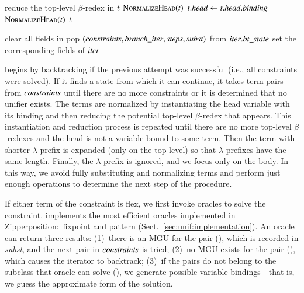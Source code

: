 \begin{algorithmic}[]
  \newpage
  
      \State reduce the top-level $\beta$-redex in $t$
      \State \Return $\textsc{NormalizeHead}(t)$
      \State $\mathit{t.head} \gets \mathit{t.head.binding}$
      \State \Return $\textsc{NormalizeHead}(t)$
    \Else{}
      \State \Return $t$
    \EndIf
  \EndFunction
  
  \vspace{\jot}
      \State clear all fields in 
      \State \Return {}
    \Else
    \State pop $(\mathit{constraints}, \mathit{branch\_iter}, \mathit{steps}, \mathit{subst})$ from $\mathit{iter.bt\_state}$
    \State set the corresponding fields of $\mathit{iter}$
    \State \Return {}
    \EndIf
  \EndFunction
  \vspace{\jot}
  
\end{algorithmic} 

 begins by backtracking if the previous attempt was successful (i.e., 
all constraints were solved). If it finds a state from which it can continue,
it takes term pairs from $\mathit{constraints}$ until
there are no more constraints or it is determined that no unifier exists. The terms
are normalized by instantiating the head variable with its binding and then
reducing the potential top-level $\beta$-redex that appears. This instantiation
and reduction process is repeated
until there are no more top-level $\beta$-redexes and the head is
not a variable bound to some term. Then the term with shorter
$\lambda$ prefix is expanded (only on the top-level) so that $\lambda$ prefixes have the
same length. Finally, the $\lambda$ prefix is ignored, and we
focus only on the body. In this way, we avoid fully substituting
and normalizing terms and perform just enough operations
to determine the next step of the procedure.

If either term of the constraint is flex, we first invoke oracles to solve the
constraint. \ehohii{} implements the most efficient oracles implemented in
Zipperposition:\ fixpoint and pattern (Sect.~\ref{sec:unif:implementation}). An oracle can return three results:
(1)~there is an MGU for the pair (), which is recorded in
\emph{subst}, and the next pair in $\emph{constraints}$ is tried;
(2)~no MGU exists
for the pair (), which causes the iterator to backtrack;
(3)~if the pairs do not belong to the subclass that oracle
can solve (), we generate possible variable bindings---that is,
we guess the approximate form of the solution.

